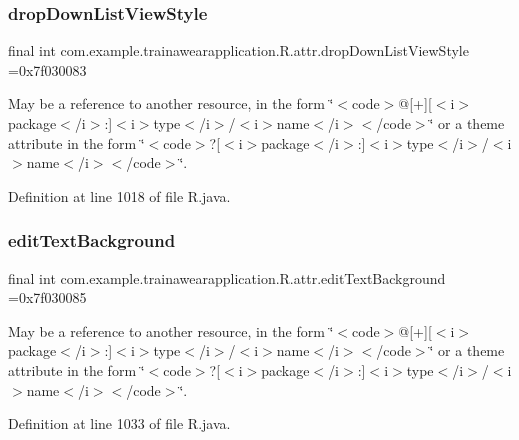 \subsubsection{\texorpdfstring{dropDownListViewStyle}{dropDownListViewStyle}}
{\footnotesize\ttfamily final int com.\+example.\+trainawearapplication.\+R.\+attr.\+drop\+Down\+List\+View\+Style =0x7f030083\hspace{0.3cm}{\ttfamily [static]}}

May be a reference to another resource, in the form \char`\"{}$<$code$>$@\mbox{[}+\mbox{]}\mbox{[}$<$i$>$package$<$/i$>$\+:\mbox{]}$<$i$>$type$<$/i$>$/$<$i$>$name$<$/i$>$$<$/code$>$\char`\"{} or a theme attribute in the form \char`\"{}$<$code$>$?\mbox{[}$<$i$>$package$<$/i$>$\+:\mbox{]}$<$i$>$type$<$/i$>$/$<$i$>$name$<$/i$>$$<$/code$>$\char`\"{}. 

Definition at line 1018 of file R.\+java.

\mbox{\label{classcom_1_1example_1_1trainawearapplication_1_1_r_1_1attr_a972c72ad67afd6c4b058907fdc6d8f21}} 
\subsubsection{\texorpdfstring{editTextBackground}{editTextBackground}}
{\footnotesize\ttfamily final int com.\+example.\+trainawearapplication.\+R.\+attr.\+edit\+Text\+Background =0x7f030085\hspace{0.3cm}{\ttfamily [static]}}

May be a reference to another resource, in the form \char`\"{}$<$code$>$@\mbox{[}+\mbox{]}\mbox{[}$<$i$>$package$<$/i$>$\+:\mbox{]}$<$i$>$type$<$/i$>$/$<$i$>$name$<$/i$>$$<$/code$>$\char`\"{} or a theme attribute in the form \char`\"{}$<$code$>$?\mbox{[}$<$i$>$package$<$/i$>$\+:\mbox{]}$<$i$>$type$<$/i$>$/$<$i$>$name$<$/i$>$$<$/code$>$\char`\"{}. 

Definition at line 1033 of file R.\+java.

\mbox{\label{classcom_1_1example_1_1trainawearapplication_1_1_r_1_1attr_aa1a6197ef2b71f812337d098c7671c24}} 
